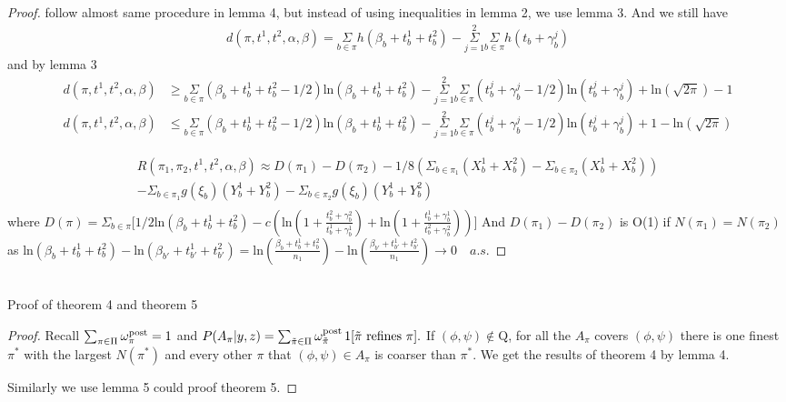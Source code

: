 \documentclass[aoas,preprint]{imsart}
\begin{document}
\begin{proof}
follow almost same procedure in lemma 4, but instead of using inequalities in lemma 2, we use lemma 3. And we still have
\begin{eqnarray*}
d(\pi, t^1, t^2, \alpha, \beta) = \underset{b\in \pi}\Sigma h(\beta_b + t_b^1 + t_b^2) - \overset{2}{\underset{j = 1}{\Sigma}} \underset{b\in \pi}\Sigma h(t_b + \gamma_b^j)
\end{eqnarray*}
and by lemma 3
\begin{align}
d(\pi, t^1, t^2, \alpha, \beta) &\geq \underset{b\in \pi}\Sigma (\beta_b + t_b^1 + t_b^2 - 1/2) \text{ln}(\beta_b  + t_b^1 + t_b^2) - \overset{2}{\underset{j = 1}{\Sigma}}\underset{b\in\pi}\Sigma (t_b^j + \gamma_b^j - 1/2) \text{ln}(t_b^j + \gamma_b^j) + \text{ln}(\sqrt{2\pi}) - 1\\
d(\pi, t^1, t^2, \alpha, \beta) &\leq \underset{b\in \pi}\Sigma (\beta_b + t_b^1 + t_b^2 - 1/2) \text{ln}(\beta_b  + t_b^1 + t_b^2) - \overset{2}{\underset{j = 1}{\Sigma}}\underset{b\in\pi}\Sigma (t_b^j + \gamma_b^j - 1/2) \text{ln}(t_b^j + \gamma_b^j) + 1 - \text{ln}(\sqrt{2\pi})
\end{align}

\begin{eqnarray*}
R(\pi_1, \pi_2, t^1, t^2, \alpha, \beta)  \approx D(\pi_1) - D(\pi_2) - 1/8 (\Sigma_{b\in\pi_1}(X_b^1 + X_b^2) - \Sigma_{b\in\pi_2}(X_b^1 + X_b^2)) \\ 
 - \Sigma_{b\in\pi_1}g(\xi_b)(Y_b^1 + Y_b^2)  - \Sigma_{b\in\pi_2}g(\xi_ b)(Y_b^1 + Y_b^2)\\
\end{eqnarray*}
where $D(\pi) = \Sigma_{b\in\pi}\big[1/2 \text{ln}(\beta_b + t_b^1 + t_b^2) 
  - c(\text{ln}(1 + \frac{t_b^2 + \gamma_b^2}{t_b^1 + \gamma_b^1}) + \text{ln}(1 + \frac{t_b^1 + \gamma_b^1}{t_b^2 + \gamma_b^2}))\big]$
And $D(\pi_1) - D(\pi_2)$ is O(1) if $N(\pi_1) = N(\pi_2)$ as $ \text{ln}(\beta_b + t_b^1 + t_b^2)  -  \text{ln}(\beta_{b'} + t_{b'}^1 + t_{b'}^2) =  \text{ln}(\frac{\beta_b + t_b^1 + t_b^2}{n_1})  -  \text{ln}(\frac{\beta_{b'} + t_{b'}^1 + t_{b'}^2}{n_1}) \rightarrow 0 \quad a.s.$


\end{proof}



\hfill\\
Proof of theorem 4 and theorem 5
\begin{proof}

Recall $\sum_{\pi \in \Pi} \omega^{\rm post}_{ \pi} = 1$ and $P(A_\pi|y,z) = 
\sum_{\tilde \pi \in \Pi} \omega^{\rm post}_{\tilde \pi} \,  1[ {\mbox {\rm $\tilde \pi$ refines $\pi$}} ].$  If $(\phi, \psi) \notin \text{Q}$, for all the $A_\pi$ covers $(\phi, \psi)$ there is one finest $\pi^*$ with the largest $N(\pi^*)$ and every other $\pi$ that $(\phi,\psi) \in A_\pi$ is coarser than $\pi^*$. We get the results of theorem 4 by lemma 4.

Similarly we use lemma 5 could proof theorem 5. 

\end{proof}
\end{document}
